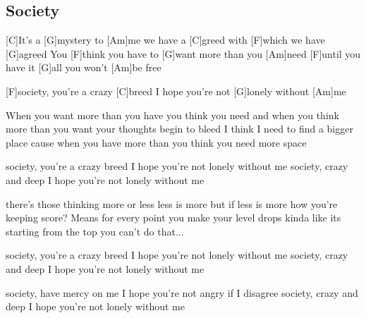 \subsection*{Society   }

\begin{guitar}


[C]It's a [G]mystery to [Am]me
we have a [C]greed with [F]which we have [G]agreed
You [F]think you have to [G]want more than you [Am]need
[F]until you have it [G]all you won't [Am]be free

[F]society, you're a crazy [C]breed
I hope you're not [G]lonely without [Am]me

When you want more than you have you think you need
and when you think more than you want your thoughts begin to bleed
I think I need to find a bigger place
cause when you have more than you think you need more space

society, you're a crazy breed
I hope you're not lonely without me
society, crazy and deep
I hope you're not lonely without me

there's those thinking more or less less is more
but if less is more how you're keeping score?
Means for every point you make your level drops
kinda like its starting from the top
you can't do that...

society, you're a crazy breed
I hope you're not lonely without me
society, crazy and deep
I hope you're not lonely without me

society, have mercy on me
I hope you're not angry if I disagree
society, crazy and deep
I hope you're not lonely without me

\end{guitar}

